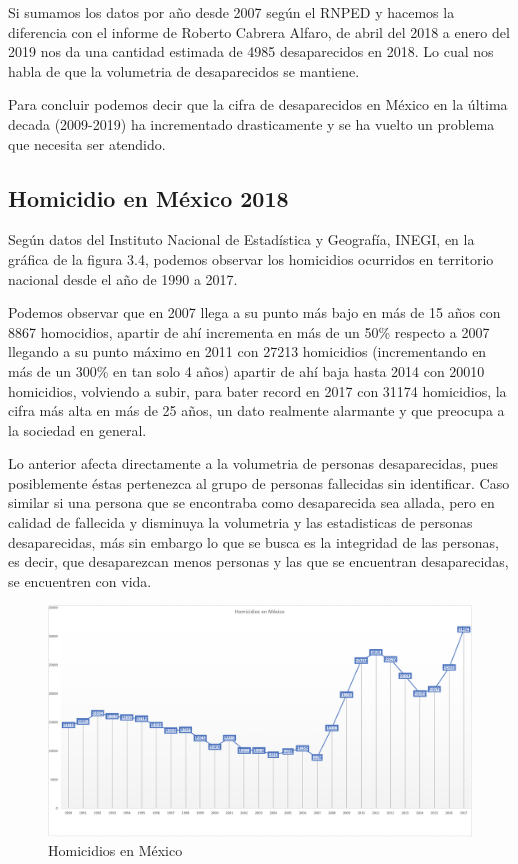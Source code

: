 Si sumamos los datos por año desde 2007 seg\'un el RNPED y hacemos la diferencia con el informe de Roberto Cabrera Alfaro, de abril del 2018 a enero del 2019 nos da una cantidad estimada de 4985 desaparecidos en 2018. Lo cual nos habla de que la volumetria de desaparecidos se mantiene.

Para concluir podemos decir que la cifra de desaparecidos en M\'exico en la \'ultima decada (2009-2019) ha incrementado drasticamente y se ha vuelto un problema que necesita ser atendido.

\subsection{Homicidio en México 2018}

Según datos del Instituto Nacional de Estadística y Geografía, INEGI, en la gráfica de la figura 3.4, podemos observar los homicidios ocurridos en territorio nacional desde el año de 1990 a 2017.

Podemos observar que en 2007 llega a su punto más bajo en más de 15 años con 8867 homocidios, apartir de ahí incrementa en más de un 50\% respecto a 2007 llegando a su punto máximo en 2011 con 27213 homicidios (incrementando en más de un 300\% en tan solo 4 años) apartir de ahí baja hasta 2014 con 20010 homicidios, volviendo a subir, para bater record en 2017 con 31174 homicidios, la cifra más alta en más de 25 años, un dato realmente alarmante y que preocupa a la sociedad en general.

Lo anterior afecta directamente a la volumetria de personas desaparecidas, pues posiblemente éstas pertenezca al grupo de personas fallecidas sin identificar. Caso similar si una persona que se encontraba como desaparecida sea allada, pero en calidad de fallecida y disminuya la volumetria y las estadisticas de personas desaparecidas, más sin embargo lo que se busca es la integridad de las personas, es decir, que desaparezcan menos personas y las que se encuentran desaparecidas, se encuentren con vida.

\begin{figure}[bp!]
	\centering
	\includegraphics[width=5in]{imgs/homicidios}
	  \caption{Homicidios en México}
\end{figure}

